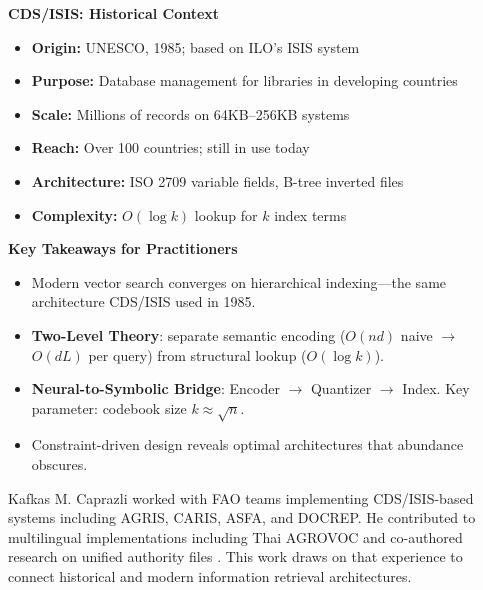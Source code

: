 \documentclass[manuscript,screen,nonacm]{acmart}
\newenvironment{sidebarbox}[1][]{%
  \def\sidebarboxtitle{#1}%
  \begin{oframed}%
  \noindent\textbf{\sidebarboxtitle}\par\smallskip
}{%
  \end{oframed}%
}
\begin{document}
\begin{sidebarbox}[CDS/ISIS: Historical Context]
\begin{itemize}
    \item \textbf{Origin:} UNESCO, 1985; based on ILO's ISIS system
    \item \textbf{Purpose:} Database management for libraries in developing countries
    \item \textbf{Scale:} Millions of records on 64KB--256KB systems
    \item \textbf{Reach:} Over 100 countries; still in use today
    \item \textbf{Architecture:} ISO 2709 variable fields, B-tree inverted files
    \item \textbf{Complexity:} $O(\log k)$ lookup for $k$ index terms
\end{itemize}
\end{sidebarbox}

\begin{sidebarbox}[Key Takeaways for Practitioners]
\begin{itemize}
    \item Modern vector search converges on hierarchical indexing---the same architecture CDS/ISIS used in 1985.
    \item \textbf{Two-Level Theory}: separate semantic encoding ($O(nd)$ naive $\rightarrow$ $O(dL)$ per query) from structural lookup ($O(\log k)$).
    \item \textbf{Neural-to-Symbolic Bridge}: Encoder $\rightarrow$ Quantizer $\rightarrow$ Index. Key parameter: codebook size $k \approx \sqrt{n}$.
    \item Constraint-driven design reveals optimal architectures that abundance obscures.
\end{itemize}
\end{sidebarbox}




\begin{acks}
Kafkas M. Caprazli worked with FAO teams implementing CDS/ISIS-based systems including AGRIS, CARIS, ASFA, and DOCREP. He contributed to multilingual implementations including Thai AGROVOC and co-authored research on unified authority files \cite{caprazli2003}. This work draws on that experience to connect historical and modern information retrieval architectures.
\end{acks}
\end{document}

